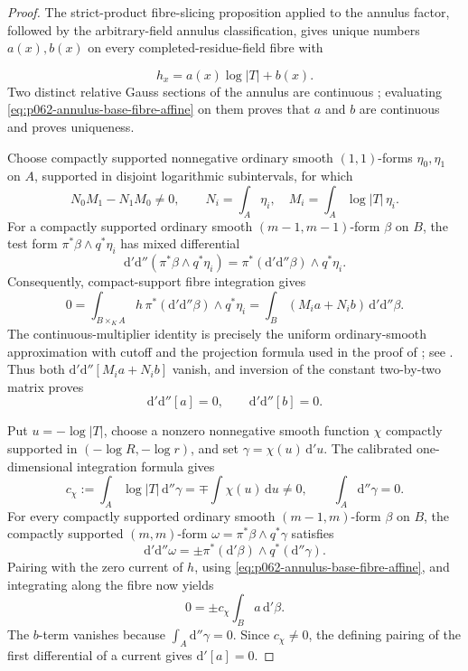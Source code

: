 \begin{proof}
The strict-product fibre-slicing proposition applied to the annulus factor,
followed by the arbitrary-field annulus classification, gives unique
numbers \(a(x),b(x)\) on every completed-residue-field fibre with

\[
                         h_x=a(x)\log|T|+b(x).
\tag{\(\star\)}\label{eq:p062-annulus-base-fibre-affine}
\]
Two distinct relative Gauss sections of the annulus are continuous
\cite[\S\S12.1.10--12.1.11]{CLD25}; evaluating \eqref{eq:p062-annulus-base-fibre-affine}
on them proves that \(a\) and \(b\) are continuous and proves uniqueness.

Choose compactly supported nonnegative ordinary smooth \((1,1)\)-forms
\(\eta_0,\eta_1\) on \(A\), supported in disjoint logarithmic subintervals,
for which
\[
 N_0M_1-N_1M_0\ne0,
 \qquad N_i=\int_A\eta_i,\quad M_i=\int_A\log|T|\,\eta_i.
\]
For a compactly supported ordinary smooth \((m-1,m-1)\)-form \(\beta\) on
\(B\), the test form \(\pi^*\beta\wedge q^*\eta_i\) has mixed differential
\[
 \mathrm d'\mathrm d''(\pi^*\beta\wedge q^*\eta_i)
   =\pi^*(\mathrm d'\mathrm d''\beta)\wedge q^*\eta_i.
\]
Consequently, compact-support fibre integration gives
\[
 0=\int_{B\times_KA}h\,\pi^*(\mathrm d'\mathrm d''\beta)\wedge q^*\eta_i
  =\int_B(M_i a+N_i b)\,\mathrm d'\mathrm d''\beta.
\]
The continuous-multiplier identity is precisely the uniform
ordinary-smooth approximation with cutoff and the projection formula used in
the proof of ; see
\cite[Theorem~16.5.4 and Corollary~16.5.5]{CLD25}.  Thus both
\(\mathrm d'\mathrm d''[M_i a+N_i b]\) vanish, and inversion of the
constant two-by-two matrix proves
\[
              \mathrm d'\mathrm d''[a]=0,
              \qquad \mathrm d'\mathrm d''[b]=0.
\tag{\(\star\star\)}\label{eq:p062-annulus-base-coefficients-zero-current}
\]

Put \(u=-\log|T|\), choose a nonzero nonnegative smooth function \(\chi\)
compactly supported in \((-\log R,-\log r)\), and set
\(\gamma=\chi(u)\,\mathrm d'u\).  The calibrated one-dimensional
integration formula gives
\[
 c_\chi:=\int_A\log|T|\,\mathrm d''\gamma
       =\mathord\mp\int\chi(u)\,\mathrm du\ne0,
 \qquad \int_A\mathrm d''\gamma=0.
\]
For every compactly supported ordinary smooth \((m-1,m)\)-form \(\beta\)
on \(B\), the compactly supported \((m,m)\)-form
\(\omega=\pi^*\beta\wedge q^*\gamma\) satisfies
\[
 \mathrm d'\mathrm d''\omega
   =\mathord\pm\pi^*(\mathrm d'\beta)\wedge q^*(\mathrm d''\gamma).
\]
Pairing with the zero current of \(h\), using
\eqref{eq:p062-annulus-base-fibre-affine}, and integrating along the fibre
now yields
\[
                   0=\mathord\pm c_\chi\int_Ba\,\mathrm d'\beta.
\]
The \(b\)-term vanishes because \(\int_A\mathrm d''\gamma=0\).  Since
\(c_\chi\ne0\), the defining pairing of the first differential of a
current gives \(\mathrm d'[a]=0\).
\end{proof}

